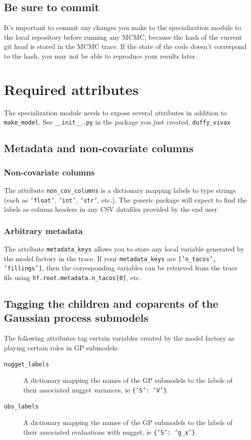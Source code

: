 \subsection{Be sure to commit}
\label{sub:git-commit} 
It's important to commit any changes you make to the specialization module to the local repository before running any MCMC, because the hash of the current git head is stored in the MCMC trace. If the state of the code doesn't correspond to the hash, you may not be able to reproduce your results later.

\section{Required attributes}

The specialization module needs to expose several attributes in addition to \texttt{make\_model}. See \texttt{\_\_init\_\_.py} in the package you just created, \texttt{duffy\_vivax}

\subsection{Metadata and non-covariate columns}
\subsubsection{Non-covariate columns} 
The attribute \texttt{non\_cov\_columns} is a dictionary mapping labels to type strings (such as \texttt{'float'}, \texttt{'int'}, \texttt{'str'}, etc.). The generic package will expect to find the labels as column headers in any CSV datafiles provided by the end user. 
\subsubsection{Arbitrary metadata} 
The attribute \texttt{metadata\_keys} allows you to store any local variable generated by the model factory in the trace. If your \texttt{metadata\_keys} are \texttt{['n\_tacos', 'fillings']}, then the corresponding variables can be retrieved from the trace file using \texttt{hf.root.metadata.n\_tacos[0]}, etc.

\subsection{Tagging the children and coparents of the Gaussian process submodels}
\label{sub:variable-tags} 
The following attributes tag certain variables created by the model factory as playing certain roles in GP submodels:
\begin{description}
    \item[\texttt{nugget\_labels}] A dictionary mapping the names of the GP submodels to the labels of their associated nugget variances, ie \texttt{\{'S': 'V'\}}.
    \item[\texttt{obs\_labels}] A dictionary mapping the names of the GP submodels to the labels of their associated evaluations with nugget, ie \texttt{\{'S': 'g\_x'\}}.
\end{description}

